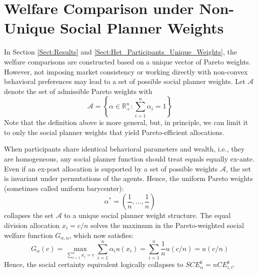 \documentclass[11pt,a4paper]{article}
\theoremstyle{definition}
\theoremstyle{plain}
\theoremstyle{remark}
\newcommand{\1}{\mathbf{1}}
\begin{document}
\section{Welfare Comparison under Non-Unique Social Planner Weights}
\label{Sect:Non-Unique_Weights}
In Section \ref{Sect:Results} and \ref{Sect:Het_Participants_Unique_Weights}, the welfare comparisons are constructed based on a unique vector of Pareto weights. However, not imposing market consistency or working directly with non-convex behavioral preferences may lead to a set of possible social planner weights. Let $\mathcal{A}$ denote the set of admissible Pareto weights with
\begin{equation*}
    \mathcal{A} = \left\{ \alpha \in \mathbb{R}_{+}^n : \sum_{i=1}^n \alpha_i = 1 \right\}
\end{equation*}
Note that the definition above is more general, but, in principle, we can limit it to only the social planner weights that yield Pareto-efficient allocations.

When participants share identical behavioral parameters and wealth, i.e., they are homogeneous, any social planner function should treat equals equally ex-ante. Even if an ex-post allocation is supported by a set of possible weights $\mathcal{A}$, the set is invariant under permutations of the agents. Hence, the uniform Pareto weights (sometimes called uniform barycenter):
\begin{equation*}
    \alpha^* = \left( \frac{1}{n}, \dots, \frac{1}{n} \right)
\end{equation*}
collapses the set $\mathcal{A}$ to a unique social planner weight structure. The equal division allocation $x_i = c/n$ solves the maximum in the Pareto-weighted social welfare function $G_{\alpha, u}$, which now satisfies:
\begin{equation*}
    G_{\alpha}(c) = \max_{\sum_{i=1}^n x_i = c} \sum_{i=1}^n \alpha_i u(x_i) = \sum_{i=1}^n \frac{1}{n} u(c/n) = u(c/n)
\end{equation*}
Hence, the social certainty equivalent logically collapses to $SCE_{\alpha}^k = n CE_{i,t}^k$.
\end{document}
